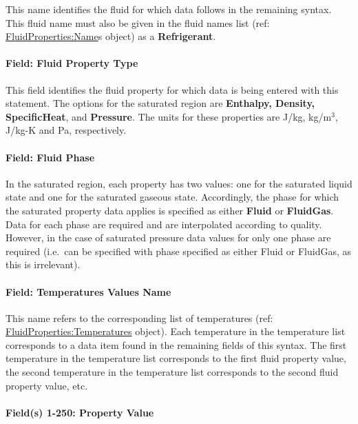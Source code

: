 This name identifies the fluid for which data follows in the remaining syntax. This fluid name must also be given in the fluid names list (ref: \hyperref[fluidpropertiesname]{FluidProperties:Name}s object) as a \textbf{Refrigerant}.

\paragraph{Field: Fluid Property Type}\label{field-fluid-property-type}

This field identifies the fluid property for which data is being entered with this statement. The options for the saturated region are \textbf{Enthalpy, Density, SpecificHeat}, and \textbf{Pressure}. The units for these properties are J/kg, kg/m\(^{3}\), J/kg-K and Pa, respectively.

\paragraph{Field: Fluid Phase}\label{field-fluid-phase}

In the saturated region, each property has two values: one for the saturated liquid state and one for the saturated gaseous state. Accordingly, the phase for which the saturated property data applies is specified as either \textbf{Fluid} or \textbf{FluidGas}. Data for each phase are required and are interpolated according to quality. However, in the case of saturated pressure data values for only one phase are required (i.e.~can be specified with phase specified as either Fluid or FluidGas, as this is irrelevant).

\paragraph{Field: Temperatures Values Name}\label{field-temperatures-values-name}

This name refers to the corresponding list of temperatures (ref: \hyperref[fluidpropertiestemperatures]{FluidProperties:Temperatures} object). Each temperature in the temperature list corresponds to a data item found in the remaining fields of this syntax. The first temperature in the temperature list corresponds to the first fluid property value, the second temperature in the temperature list corresponds to the second fluid property value, etc.

\paragraph{Field(s) 1-250: Property Value}\label{fields-1-250-property-value}

